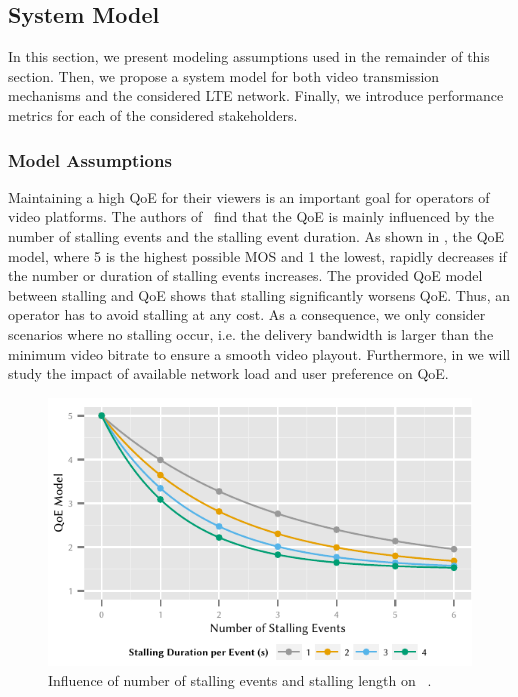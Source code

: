 \subsection{System Model}\label{sec:application:lte_video:system_model}
In this section, we present modeling assumptions used in the remainder of this section.
Then, we propose a system model for both video transmission mechanisms and the considered \gls{LTE} network.
Finally, we introduce performance metrics for each of the considered stakeholders.

\subsubsection*{Model Assumptions}\label{sec:application:lte_video:system_model:model_assumptions}
Maintaining a high \gls{QoE} for their viewers is an important goal for operators of video platforms.
The authors of~\cite{Hossfeld2012a} find that the \gls{QoE} is mainly influenced by the number of stalling events and the stalling event duration.
As shown in , the \gls{QoE} model, where 5 is the highest possible \gls{MOS} and 1 the lowest, rapidly decreases if the number or duration of stalling events increases.
The provided \gls{QoE} model between stalling and \gls{QoE} shows that stalling significantly worsens \gls{QoE}.
Thus, an operator has to avoid stalling at any cost.
As a consequence, we only consider scenarios where no stalling occur, i.e. the delivery bandwidth is larger than the minimum video bitrate to ensure a smooth video playout.
Furthermore, in  we will study the impact of available network load and user preference on \gls{QoE}.

\begin{figure}
  \includegraphics{application/lte_video/system_model/figures/stalling2qoe}
  \caption{Influence of number of stalling events and stalling length on ~\cite{Hossfeld2012a}.}
  \label{fig:application:lte_video:system_model:stalling2qoe}
\end{figure}

